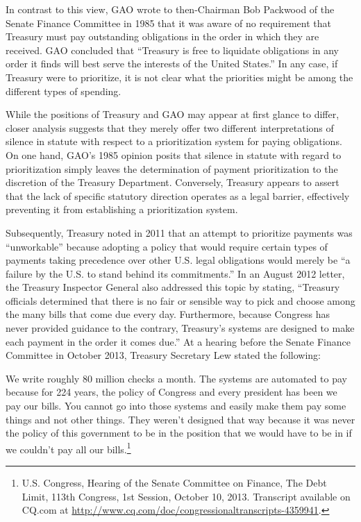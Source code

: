 In contrast to this view, GAO wrote to then-Chairman Bob Packwood of the Senate Finance Committee in 1985 that it was aware of no requirement that Treasury must pay outstanding obligations in the order in which they are received. GAO concluded that “Treasury is free to liquidate obligations in any order it finds will best serve the interests of the United States.” In any case, if Treasury were to prioritize, it is not clear what the priorities might be among the different types of spending.

While the positions of Treasury and GAO may appear at first glance to differ, closer analysis suggests that they merely offer two different interpretations of silence in statute with respect to a prioritization system for paying obligations. On one hand, GAO’s 1985 opinion posits that silence in statute with regard to prioritization simply leaves the determination of payment prioritization to the discretion of the Treasury Department. Conversely, Treasury appears to assert that the lack of specific statutory direction operates as a legal barrier, effectively preventing it from establishing a prioritization system.

Subsequently, Treasury noted in 2011 that an attempt to prioritize payments was “unworkable” because adopting a policy that would require certain types of payments taking precedence over other U.S. legal obligations would merely be “a failure by the U.S. to stand behind its commitments.” In an August 2012 letter, the Treasury Inspector General also addressed this topic by stating, “Treasury officials determined that there is no fair or sensible way to pick and choose among the many bills that come due every day. Furthermore, because Congress has never provided guidance to the contrary, Treasury’s systems are designed to make each payment in the order it comes due.” At a hearing before the Senate Finance Committee in October 2013, Treasury Secretary Lew stated the following:

\begin{displayquote}
We write roughly 80 million checks a month. The systems are automated to pay because for 224 years, the policy of Congress and every president has been we pay our bills. You cannot go into those systems and easily make them pay some things and not other things. They weren't designed that way because it was never the policy of this government to be in the position that we would have to be in if we couldn't pay all our bills.\footnote{U.S. Congress, Hearing of the Senate Committee on Finance, The Debt Limit, 113th Congress, 1st Session, October 10, 2013. Transcript available on CQ.com at \url{http://www.cq.com/doc/congressionaltranscripts-4359941}.}
\end{displayquote}

